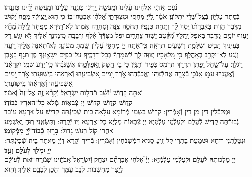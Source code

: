 \documentclass[twoside, openany, parskip=half, 11pt]{book}
\begin{document}
\halfkaddish


\label{vihi noam}
 \\
נֹ֨עַם אֲדֹנָ֥י אֱלֹהֵ֗ינוּ עָ֫לֵ֥ינוּ וּמַֽעֲשֵׂ֣ה יָ֭דֵינוּ כּֽוֹנֲנָ֣ה עָלֵ֑ינוּ וּמַֽעֲשֵׂ֥ה יָ֝דֵ֗ינוּ כּֽוֹנֲנֵֽהוּ׃\\
בְּֿסֵ֣תֶר עֶלְי֑וֹן בְּֿצֵ֥ל שַׁ֝דַּ֗י יִתְלוֹנָֽן׃
אֹמַ֗ר לַ֭יְֿיָ מַחְסִ֣י וּמְצֽוּדָתִ֑י אֱ֝לֹהַ֗י אֶבְטַח־בּֽוֹ׃
כִּ֤י ה֣וּא יַ֭צִּֽילְֿךָ מִפַּ֥ח יָ֝ק֗וּשׁ מִדֶּ֥בֶר הַוּֽוֹת׃
בְּֿאֶבְרָת֨וֹ יָ֣סֶךְ לָ֗ךְ וְֿתַ֣חַת כְּֿנָפָ֣יו תֶּחְסֶ֑ה צִנָּ֖ה וְֿסֹֽחֵרָ֣ה אֲמִתּֽוֹ׃
לֹֽא־תִ֭ירָא מִפַּ֣חַד לָ֑יְֿלָה מֵ֝חֵ֗ץ יָע֥וּף יוֹמָֽם׃
מִ֭דֶּֽבֶר בָּאֹ֣פֶל יַֽהֲלֹ֑ךְ מִ֝קֶּ֗טֶב יָשׁ֥וּד צָֽהֳרָֽיִם׃
יִפֹּ֤ל מִצִּדְּֿךָ֙ אֶ֗לֶף וּרְבָבָ֥ה מִֽימִינֶ֑ךָ אֵ֝לֶ֗יךָ לֹ֣א יִגָּֽשׁ׃
רַ֭ק בְּֿעֵינֶ֣יךָ תַבִּ֑יט וְֿשִׁלֻּמַ֖ת רְֿשָׁעִ֣ים תִּרְאֶֽה׃
כִּֽי־אַתָּ֣ה יְיָ֣ מַחְסִּ֑י עֶ֝לְי֗וֹן שַׂ֣מְתָּ מְֿעוֹנֶֽךָ׃
לֹֽא־תְֿאֻנֶּ֣ה אֵלֶ֣יךָ רָעָ֑ה וְֿנֶ֗֝גַע לֹֽא־יִקְרַ֥ב בְּֿאָֽהֳלֶֽךָ׃
כִּ֣י מַ֭לְאָכָיו יְֿצַוֶּה־לָּ֑ךְ לִ֝שְׁמָרְֿךָ֗ בְּֿכׇל־דְּֿרָכֶֽיךָ׃
עַל־כַּפַּ֥יִם יִשָּׂא֑וּנְֿךָ פֶּן־תִּגֹּ֖ף בָּאֶ֣בֶן רַגְלֶֽךָ׃
עַל־שַׁ֣חַל וָפֶ֣תֶן תִּדְרֹ֑ךְ תִּרְמֹ֖ס כְּֿפִ֣יר וְֿתַנִּֽין׃
כִּ֤י בִ֣י חָ֭שַׁק וַֽאֲפַלְּֿטֵ֑הוּ אֲשַׂ֝גְּֿבֵ֗הוּ כִּֽי־יָדַ֥ע שְֿׁמִֽי׃
יִקְרָאֵ֨נִי וְֽֿאֶֽעֱנֵ֗הוּ עִמּ֣וֹ אָֽנֹכִ֣י בְֿצָרָ֑ה אֲ֝חַלְּֿצֵֽ֗הוּ וַֽאֲכַבְּֿדֵֽהוּ׃
אֹ֣רֶךְ יָ֭מִים ֖אַשְׂבִּיעֵ֑הוּ וְֿ֝אַרְאֵ֗הוּ בִּֽישֽׁוּעָתִֽי׃
אֹ֣רֶךְ יָ֭מִים ֖אַשְׂבִּיעֵ֑הוּ וְֿ֝אַרְאֵ֗הוּ בִּֽישֽׁוּעָתִֽי׃\\
\label{v ata kadosh}
וְֿאַתָּ֥ה
%
קָד֑וֹשׁ י֝וֹשֵׁ֗ב תְּֿהִלּ֥וֹת יִשְׂרָאֵֽל׃
%
וְֿקָרָ֨א זֶ֤ה אֶל־זֶה֙ וְֿאָמַ֔ר׃\\
\textbf{קָד֧וֹשׁ קָד֛וֹשׁ קָד֖וֹשׁ יְיָ֣ צְֿבָא֑וֹת מְֿלֹ֥א כׇל־הָאָ֖רֶץ כְּֿבוֹדֽוֹ׃}\\
וּמְקַבְּֿלִין דֵּין מִן דֵּין וְֿאָמְֿרִין: קַדִּישׁ בִּשְׁמֵי מְֿרוֹמָא עִלָּאָה בֵּית שְֿׁכִינְֿתֵּהּ קַדִּישׁ עַל אַרְעָא עוֹבַד גְּֿבוּרְֿתֵּהּ קַדִּישׁ לְֿעָלַם וּלְעָלְֿמֵי עָלְֿמַיָּא יְיָ צְֿבָאוֹת מַלְיָא כׇל־אַרְעָא זִיו יְֿקָרֵהּ:  וַתִּשָּׂאֵֽנִי רֽוּחַ וָאֶשְׁמַע אַחֲרַי קוֹל רַֽעַשׁ גָּדוֹל:
\textbf{בָּר֥וּךְ כְּֿבוֹד־יְֿיָ֖ מִמְּֿקוֹמֽוֹ׃} \\
וּנְטָלַֽתְנִי רוּחָא וּשְׁמָעֵת בַּתְרַי קָל זִֽיעַ סַגִּיא דִּמְֿשַׁבְּֿחִין וְֿאָמְֿרִין: בְּֿרִיךְ יְֿקָרָא דַיְֿיָ מֵאֲתַר בֵּית שְֿׁכִינְֿתֵּהּ:
\textbf{יְֿיָ֥ יִמְלֹ֖ךְ לְֿעֹלָ֥ם וָעֶֽד׃} \\
יְיָ מַלְכוּתֵהּ לְֿעָלַם וּלְעַלְֿמֵי עָלְֿמְֿיָּא: יְיָ֗
%
אֱ֠לֹהֵי אַבְרָהָ֞ם יִצְחָ֤ק וְֿיִשְׂרָאֵל֙ אֲבֹתֵ֔ינוּ שָׁמְֿרָה־זֹּ֣את לְֿעוֹלָ֔ם לְֿיֵ֥צֶר מַחְשְֿׁב֖וֹת לְֿבַ֣ב עַמֶּ֑ךָ וְֿהָכֵ֥ן לְֿבָבָ֖ם אֵלֶֽיךָ׃ וְֿה֤וּא
\end{document}
